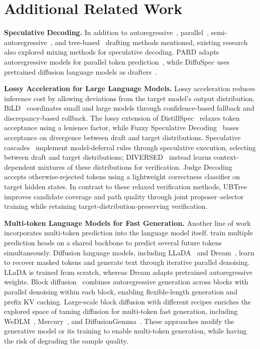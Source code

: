 \section{Additional Related Work}
\label{app:additional-related-work}

\noindent\textbf{Speculative Decoding.} In addition to autoregressive~\citep{leviathan2023fast,chen2023accelerating,li2024eagle}, parallel~\citep{chen2026dflash,liu2026dart,inco2026dflash2}, semi-autoregressive~\citep{huang2026domino,cheng2026dspark}, and tree-based~\citep{cai2024medusa,miao2024specinfer,li2024eagle2,li2026eagle,ringel2026accelerating,li2026dartree} drafting methods mentioned, existing research also explored mixing methods for speculative decoding. PARD adapts autoregressive models for parallel token prediction~\citep{an2025pard}, while DiffuSpec uses pretrained diffusion language models as drafters~\citep{li2026diffuspec}.

\noindent\textbf{Lossy Acceleration for Large Language Models.}
Lossy acceleration reduces inference cost by allowing deviations from the target model's output distribution. BiLD~\citep{kim2023biglittle} coordinates small and large models through confidence-based fallback and discrepancy-based rollback. The lossy extension of DistillSpec~\citep{zhou2024distillspec} relaxes token acceptance using a lenience factor, while Fuzzy Speculative Decoding~\citep{holsman2025fuzzy} bases acceptance on divergence between draft and target distributions. Speculative cascades~\citep{narasimhan2025faster} implement model-deferral rules through speculative execution, selecting between draft and target distributions; DIVERSED~\citep{wang2026diversed} instead learns context-dependent mixtures of these distributions for verification. Judge Decoding~\citep{bachmann2025judge,garipov2026autojudge} accepts otherwise-rejected tokens using a lightweight correctness classifier on target hidden states. In contrast to these relaxed verification methods, UBTree improves candidate coverage and path quality through joint proposer--selector training while retaining target-distribution-preserving verification.

\noindent\textbf{Multi-token Language Models for Fast Generation.}
Another line of work incorporates multi-token prediction into the language model itself. \citet{gloeckle2024better} train multiple prediction heads on a shared backbone to predict several future tokens simultaneously. Diffusion language models, including LLaDA~\citep{nie2025large} and Dream~\citep{xie2025dream}, learn to recover masked tokens and generate text through iterative parallel denoising. LLaDA is trained from scratch, whereas Dream adapts pretrained autoregressive weights. Block diffusion~\citep{arriola2025block} combines autoregressive generation across blocks with parallel denoising within each block, enabling flexible-length generation and prefix KV caching. Large-scale block diffusion with different recipes enriches the explored space of taming diffusion for multi-token fast generation, including WeDLM~\citep{liu2025wedlm}, Mercury~\citep{inception2025mercury}, and DiffusionGemma~\citep{diffusiongemma2026report}. These approaches modify the generative model or its training to enable multi-token generation, while having the risk of degrading the sample quality.

